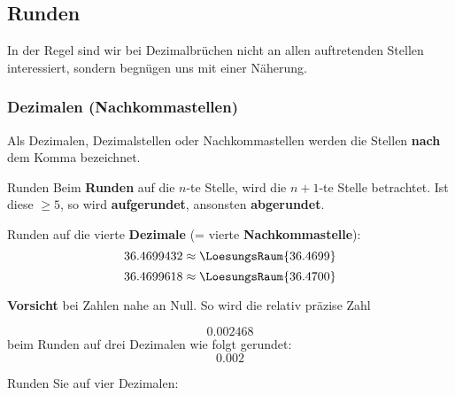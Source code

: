
\subsection{Runden}
In der Regel sind wir bei Dezimalbrüchen nicht an allen auftretenden
Stellen interessiert, sondern begnügen uns mit einer Näherung.

\subsubsection{Dezimalen (Nachkommastellen)}
Als Dezimalen, Dezimalstellen oder Nachkommastellen werden die Stellen
\textbf{nach} dem Komma bezeichnet.

\begin{gesetz}{Runden}{}
  Beim \textbf{Runden} auf die $n$-te Stelle, wird die $n+1$-te Stelle
  betrachtet. Ist diese $\ge 5$, so wird \textbf{aufgerundet}, ansonsten \textbf{abgerundet}.
\end{gesetz}

Runden auf die vierte \textbf{Dezimale} (= vierte \textbf{Nachkommastelle}):
$$ 36.4699432 \approx  \LoesungsRaum{36.4699}$$
$$ 36.4699618 \approx  \LoesungsRaum{36.4700}$$

\textbf{Vorsicht} bei Zahlen nahe an Null. So wird die relativ präzise
Zahl

$$0.002468$$ beim Runden auf drei Dezimalen wie folgt gerundet:
$$0.002$$

Runden Sie auf {\color{ForestGreen}vier} Dezimalen:


